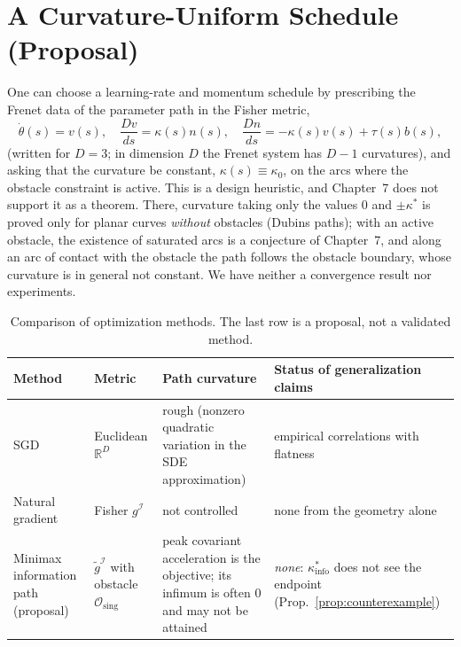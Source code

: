 \documentclass[11pt,reqno]{amsart}
\theoremstyle{definition}
\providecommand{\R}{\mathbb{R}}
\newcommand{\Fisher}{\mathcal{I}}
\numberwithin{equation}{section}
\providecommand{\R}{\mathbb{R}}
\begin{document}
\section{A Curvature-Uniform Schedule (Proposal)}

One can choose a learning-rate and momentum schedule by prescribing the Frenet data of the parameter path in the Fisher metric,
\begin{equation}
\dot{\theta}(s) = v(s), \quad \frac{D v}{ds} = \kappa(s) n(s), \quad \frac{D n}{ds} = -\kappa(s) v(s) + \tau(s) b(s),
\end{equation}
(written for $D = 3$; in dimension $D$ the Frenet system has $D-1$ curvatures), and asking that the curvature be constant, $\kappa(s) \equiv \kappa_0$, on the arcs where the obstacle constraint is active. This is a design heuristic, and Chapter~7 does not support it as a theorem. There, curvature taking only the values $0$ and $\pm\kappa^*$ is proved only for planar curves \emph{without} obstacles (Dubins paths); with an active obstacle, the existence of saturated arcs is a conjecture of Chapter~7, and along an arc of contact with the obstacle the path follows the obstacle boundary, whose curvature is in general not constant. We have neither a convergence result nor experiments.

\begin{table}[htbp]
\centering
\small
\renewcommand{\arraystretch}{1.3}
\begin{tabularx}{\textwidth}{@{} >{\raggedright\arraybackslash}p{2.8cm} >{\raggedright\arraybackslash}p{3.0cm} >{\raggedright\arraybackslash}X >{\raggedright\arraybackslash}X @{}}
\toprule
\textbf{Method} & \textbf{Metric} & \textbf{Path curvature} & \textbf{Status of generalization claims} \\
\midrule
SGD & Euclidean $\R^D$ & rough (nonzero quadratic variation in the SDE approximation) & empirical correlations with flatness \cite{keskar2016} \\
Natural gradient \cite{amari1998} & Fisher $g^{\Fisher}$ & not controlled & none from the geometry alone \\
Minimax information path (proposal) & $\tilde g^{\Fisher}$ with obstacle $\mathcal{O}_{\mathrm{sing}}$ & peak covariant acceleration is the objective; its infimum is often $0$ and may not be attained & \emph{none}: $\kappa^*_{\mathrm{info}}$ does not see the endpoint (Prop.~\ref{prop:counterexample}) \\
\bottomrule
\end{tabularx}
\caption{Comparison of optimization methods. The last row is a proposal, not a validated method.}
\end{table}
\end{document}
